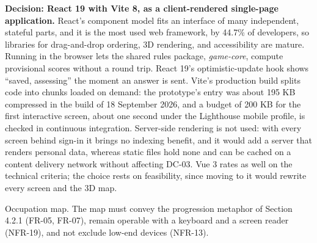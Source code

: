\textbf{Decision: React 19 with Vite 8, as a client-rendered single-page application.} React's component model fits an interface of many independent, stateful parts, and it is the most used web framework, by 44.7\% of developers\cite{r134}, so libraries for drag-and-drop ordering, 3D rendering, and accessibility are mature. Running in the browser lets the shared rules package, \textit{game-core}, compute provisional scores without a round trip. React 19's optimistic-update hook shows ``saved, assessing'' the moment an answer is sent\cite{r135}. Vite's production build splits code into chunks loaded on demand\cite{r136}: the prototype's entry was about 195 KB compressed in the build of 18 September 2026, and a budget of 200 KB for the first interactive screen, about one second under the Lighthouse mobile profile\cite{r137}, is checked in continuous integration. Server-side rendering is not used: with every screen behind sign-in it brings no indexing benefit, and it would add a server that renders personal data, whereas static files hold none and can be cached on a content delivery network without affecting DC-03. Vue 3 rates as well on the technical criteria; the choice rests on feasibility, since moving to it would rewrite every screen and the 3D map.

Occupation map. The map must convey the progression metaphor of Section 4.2.1 (FR-05, FR-07), remain operable with a keyboard and a screen reader (NFR-19), and not exclude low-end devices (NFR-13).

